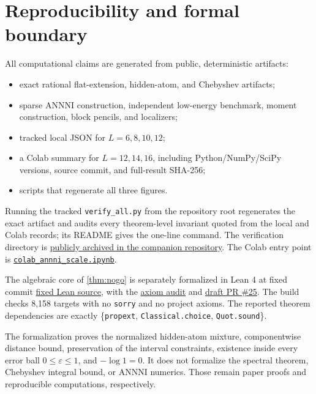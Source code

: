 \documentclass[11pt]{article}
\theoremstyle{definition}
\theoremstyle{remark}
\newcommand{\eps}{\varepsilon}
\begin{document}
\section{Reproducibility and formal boundary}

All computational claims are generated from public, deterministic artifacts:
\begin{itemize}
  \item exact rational flat-extension, hidden-atom, and Chebyshev artifacts;
  \item sparse ANNNI construction, independent low-energy benchmark, moment
  construction, block pencils, and localizers;
  \item tracked local JSON for $L=6,8,10,12$;
  \item a Colab summary for $L=12,14,16$, including Python/NumPy/SciPy
  versions, source commit, and full-result SHA-256;
  \item scripts that regenerate all three figures.
\end{itemize}
Running the tracked \texttt{verify\_all.py} from the repository root
regenerates the exact artifact and audits every theorem-level invariant quoted
from the local and Colab records; its README gives the one-line command.
The verification directory is
\href{https://github.com/lluiseriksson/aqft-split-inclusion-series/tree/4feaea81b9b642b35d7f0fbd052c22a3c2bbaf62/verification/finite_window_gap_certificates}
{publicly archived in the companion repository}.
The Colab entry point is
\href{https://github.com/lluiseriksson/aqft-split-inclusion-series/blob/4feaea81b9b642b35d7f0fbd052c22a3c2bbaf62/verification/finite_window_gap_certificates/colab_annni_scale.ipynb}
{\texttt{colab\_annni\_scale.ipynb}}.

The algebraic core of \cref{thm:nogo} is separately formalized in Lean 4 at
fixed commit
\href{https://github.com/lluiseriksson/lean-transfer-matrix/blob/1e41144/LeanTransferMatrix/FiniteNoiseBlindness.lean}
{fixed Lean source}, with the
\href{https://github.com/lluiseriksson/lean-transfer-matrix/blob/1e41144/audit/FiniteNoiseBlindnessAxioms.lean}
{axiom audit} and
\href{https://github.com/lluiseriksson/lean-transfer-matrix/pull/25}
{draft PR \#25}.  The build checks 8,158 targets with no \texttt{sorry} and no
project axioms.  The reported theorem dependencies are exactly
\{\texttt{propext}, \texttt{Classical.choice}, \texttt{Quot.sound}\}.

The formalization proves the normalized hidden-atom mixture, componentwise
distance bound, preservation of the interval constraints, existence inside
every error ball $0\leq\eps\leq1$, and $-\log1=0$.  It does not formalize the
spectral theorem, Chebyshev integral bound, or ANNNI numerics.  Those remain
paper proofs and reproducible computations, respectively.
\end{document}
